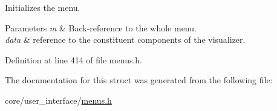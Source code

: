 Initializes the menu. 


\begin{DoxyParams}{Parameters}
{\em m} & Back-\/reference to the whole menu. \\
\hline
{\em data} & reference to the constituent components of the visualizer. \\
\hline
\end{DoxyParams}


Definition at line 414 of file menus.\+h.



The documentation for this struct was generated from the following file\+:\begin{DoxyCompactItemize}
\item 
core/user\+\_\+interface/\hyperlink{menus_8h}{menus.\+h}\end{DoxyCompactItemize}
